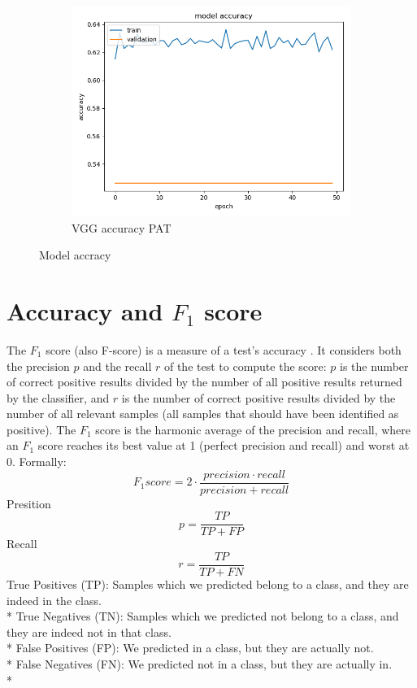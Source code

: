 \begin{figure}[h!]
\begin{subfigure}[b]{.3\linewidth}
\includegraphics[width=\linewidth]{Figs/vgg_pat_acc.jpg}
\caption{VGG accuracy PAT}
\end{subfigure}
\caption{Model accracy}
\label{fig:acc}
\end{figure}


\section{Accuracy and $F_1$ score}
The $F_1$ score (also F-score) is a measure of a test's accuracy \citep{powers2011evaluation}. It considers both the precision $p$ and the recall $r$ of the test to compute the score: $p$ is the number of correct positive results divided by the number of all positive results returned by the classifier, and $r$ is the number of correct positive results divided by the number of all relevant samples (all samples that should have been identified as positive). The $F_1$ score is the harmonic average of the precision and recall, where an $F_1$ score reaches its best value at 1 (perfect precision and recall) and worst at 0.
Formally: $$F_1 score = 2 \cdot \frac{precision \cdot recall}{precision + recall}$$
Presition $$p = \frac{TP}{TP + FP}$$
Recall $$r = \frac{TP}{TP + FN}$$
True Positives (TP): Samples which we predicted belong to a class, and they are indeed in the class.\\*
True Negatives (TN): Samples which we predicted not belong to a class, and they are indeed not in that class.\\*
False Positives (FP): We predicted in a class, but they are actually not.\\*
False Negatives (FN): We predicted not in a class, but they are actually in.\\*

